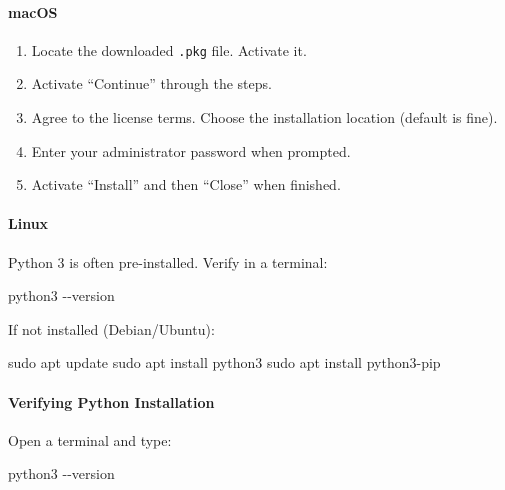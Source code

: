 \documentclass[
  justified,
  openright,
]{tufte-book}
\let\subsection\paragraph
\let\paragraph\paragraph
\newcommand{\CodeFuncTok}[1]{\textcolor{CodeKeyword}{#1}}           %
\newcommand{\CodeTypeTok}[1]{\textcolor{CodeType}{#1}}              %
\newenvironment{Shaded}{%
  \begin{mdframed}[style=TufteCode]%
}{%
  \end{mdframed}%
}
\let\subsection\paragraph
\let\paragraph\paragraph
\providecommand{\tightlist}{%
  \setlength{\itemsep}{0pt}\setlength{\parskip}{0pt}}
\begin{document}
\paragraph{macOS}\label{macos}

\begin{enumerate}
\def\labelenumi{\arabic{enumi}.}
\tightlist
\item
  Locate the downloaded \texttt{.pkg} file. Activate it.
\item
  Activate ``Continue'' through the steps.
\item
  Agree to the license terms. Choose the installation location (default
  is fine).
\item
  Enter your administrator password when prompted.
\item
  Activate ``Install'' and then ``Close'' when finished.
\end{enumerate}

\paragraph{Linux}\label{linux}

Python 3 is often pre-installed. Verify in a terminal:

\begin{Shaded}
\begin{Highlighting}[]
python3 \CodeTypeTok{{-}{-}version}
\end{Highlighting}
\end{Shaded}

If not installed (Debian/Ubuntu):

\begin{Shaded}
\begin{Highlighting}[]
\CodeFuncTok{sudo} apt update
\CodeFuncTok{sudo} apt install python3
\CodeFuncTok{sudo} apt install python3{-}pip
\end{Highlighting}
\end{Shaded}

\subsection{Verifying Python
Installation}\label{verifying-python-installation}

Open a terminal and type:

\begin{Shaded}
\begin{Highlighting}[]
python3 \CodeTypeTok{{-}{-}version}
\end{Highlighting}
\end{Shaded}
\end{document}
